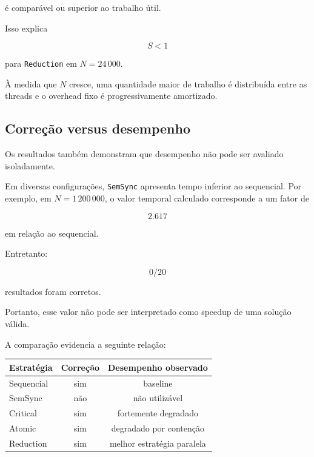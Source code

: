 é comparável ou superior ao trabalho útil.

Isso explica

\begin{equation}
    S<1
\end{equation}

para \texttt{Reduction} em \(N=24\,000\).

À medida que \(N\) cresce, uma quantidade maior de trabalho é distribuída
entre as threads e o overhead fixo é progressivamente amortizado.


\subsection{Correção versus desempenho}

Os resultados também demonstram que desempenho não pode ser avaliado
isoladamente.

Em diversas configurações, \texttt{SemSync} apresenta tempo inferior ao
sequencial. Por exemplo, em \(N=1\,200\,000\), o valor temporal calculado
corresponde a um fator de

\begin{equation}
    2.617
\end{equation}

em relação ao sequencial.

Entretanto:

\begin{equation}
    0/20
\end{equation}

resultados foram corretos.

Portanto, esse valor não pode ser interpretado como speedup de uma solução
válida.

A comparação evidencia a seguinte relação:

\begin{center}
\begin{tabular}{l|c|c}
    \hline
    Estratégia & Correção & Desempenho observado \\
    \hline
    Sequencial & sim & baseline \\
    SemSync & não & não utilizável \\
    Critical & sim & fortemente degradado \\
    Atomic & sim & degradado por contenção \\
    Reduction & sim & melhor estratégia paralela \\
    \hline
\end{tabular}
\end{center}


